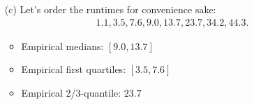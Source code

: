 
\begin{solution}

\phantom{}

\begin{enumerate}
    \item[(c)] Let's order the runtimes for convenience sake:
    \begin{align*}
        1.1, 3.5, 7.6, 9.0, 13.7, 23.7, 34.2, 44.3.
    \end{align*} 
    \begin{itemize}
        \item Empirical medians: $[9.0, 13.7]$
        \item Empirical first quartiles: $[3.5, 7.6]$
        \item Empirical 2/3-quantile: $23.7$
    \end{itemize} 
\end{enumerate}

\end{solution}

